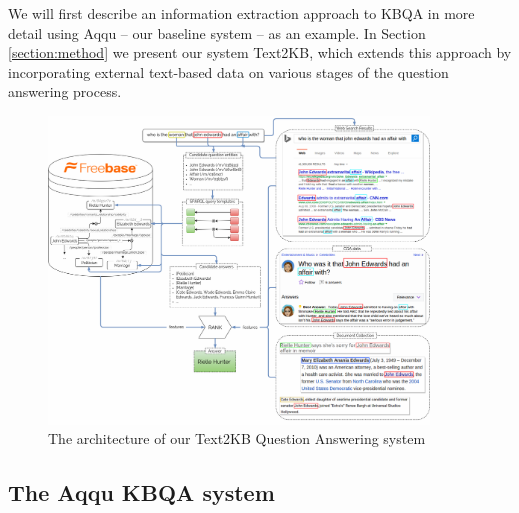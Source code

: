 
We will first describe an information extraction approach to KBQA in more detail using Aqqu -- our baseline system -- as an example.
In Section \ref{section:method} we present our system Text2KB, which extends this approach by incorporating external text-based data on various stages of the question answering process.

\begin{figure}[!ht]
\centering
\includegraphics[width=0.9\textwidth]{img/Text2KB_model}
\vspace{-4mm}
\caption{The architecture of our Text2KB Question Answering system}
\label{fig:model}
\end{figure}


\subsection{The Aqqu KBQA system}
\label{sec:baseline:aqqu}

